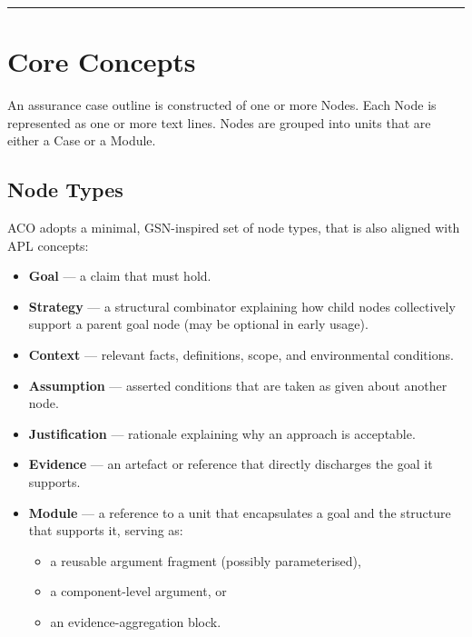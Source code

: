 \documentclass[11pt]{article}
\begin{document}
\bigskip
\hrule
\bigskip

\section{Core Concepts}
An assurance case outline is constructed of one or more Nodes.
Each Node is represented as one or more text lines.
Nodes are grouped into units that are either a Case or a Module.

\subsection{Node Types}

ACO adopts a minimal, GSN-inspired set of node types, that is also aligned with APL concepts:

\begin{itemize}[leftmargin=2em]
  \item \textbf{Goal} --- a claim that must hold.
  \item \textbf{Strategy} --- a structural combinator explaining how child nodes collectively
        support a parent goal node (may be optional in early usage).
  \item \textbf{Context} --- relevant facts, definitions, scope, and environmental conditions.
  \item \textbf{Assumption} --- asserted conditions that are taken as given about another node.
  \item \textbf{Justification} --- rationale explaining why an approach is acceptable.
  \item \textbf{Evidence} --- an artefact or reference that directly discharges the goal it
        supports.
  \item \textbf{Module} --- a reference to a unit that encapsulates a goal and the
        structure that supports it, serving as:
  \begin{itemize}[leftmargin=1.5em]
    \item a reusable argument fragment (possibly parameterised),
    \item a component-level argument, or
    \item an evidence-aggregation block.
  \end{itemize}
\end{itemize}
\end{document}
